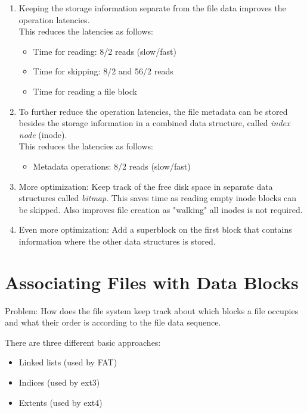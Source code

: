 \documentclass[a4paper, 11pt, accentcolor = tud3b]{tudreport}
\begin{document}
            \begin{enumerate}
            	\item Keeping the storage information separate from the file data improves the operation latencies. \\ This reduces the latencies as follows:
	            	\begin{itemize}
	            		\item Time for reading: 8/2 reads (slow/fast)
	            		\item Time for skipping: 8/2 and 56/2 reads
	            		\item Time for reading a file block
	            	\end{itemize}
            	\item To further reduce the operation latencies, the file metadata can be stored besides the storage information in a combined data structure, called \textit{index node} (inode). \\ This reduces the latencies as follows:
	            	\begin{itemize}
	            		\item Metadata operations: 8/2 reads (slow/fast)
	            	\end{itemize}
            	\item More optimization: Keep track of the free disk space in separate data structures called \textit{bitmap}. This saves time as reading empty inode blocks can be skipped. Also improves file creation as "walking" all inodes is not required.
            	\item Even more optimization: Add a superblock on the first block that contains information where the other data structures is stored.
            \end{enumerate}

        \section{Associating Files with Data Blocks}
            Problem: How does the file system keep track about which blocks a file occupies and what their order is according to the file data sequence.
            
            There are three different basic approaches:
            \begin{itemize}
            	\item Linked lists (used by FAT)
            	\item Indices (used by ext3)
            	\item Extents (used by ext4)
            \end{itemize}
\end{document}
